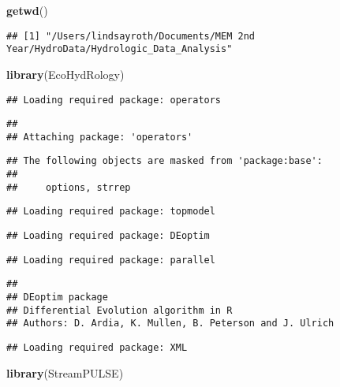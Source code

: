 \documentclass[]{article}
\newenvironment{Shaded}{\begin{snugshade}}{\end{snugshade}}
\newcommand{\KeywordTok}[1]{\textcolor[rgb]{0.13,0.29,0.53}{\textbf{#1}}}
\newcommand{\NormalTok}[1]{#1}
\begin{document}
\begin{Shaded}
\begin{Highlighting}[]
\KeywordTok{getwd}\NormalTok{()}
\end{Highlighting}
\end{Shaded}

\begin{verbatim}
## [1] "/Users/lindsayroth/Documents/MEM 2nd Year/HydroData/Hydrologic_Data_Analysis"
\end{verbatim}

\begin{Shaded}
\begin{Highlighting}[]
\KeywordTok{library}\NormalTok{(EcoHydRology)}
\end{Highlighting}
\end{Shaded}

\begin{verbatim}
## Loading required package: operators
\end{verbatim}

\begin{verbatim}
## 
## Attaching package: 'operators'
\end{verbatim}

\begin{verbatim}
## The following objects are masked from 'package:base':
## 
##     options, strrep
\end{verbatim}

\begin{verbatim}
## Loading required package: topmodel
\end{verbatim}

\begin{verbatim}
## Loading required package: DEoptim
\end{verbatim}

\begin{verbatim}
## Loading required package: parallel
\end{verbatim}

\begin{verbatim}
## 
## DEoptim package
## Differential Evolution algorithm in R
## Authors: D. Ardia, K. Mullen, B. Peterson and J. Ulrich
\end{verbatim}

\begin{verbatim}
## Loading required package: XML
\end{verbatim}

\begin{Shaded}
\begin{Highlighting}[]
\KeywordTok{library}\NormalTok{(StreamPULSE)}
\end{Highlighting}
\end{Shaded}
\end{document}

